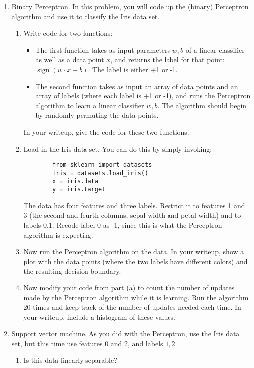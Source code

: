 \documentclass{article}
\begin{document}
\begin{enumerate}
    \item Binary Perceptron. In this problem, you will code up the (binary) Perceptron algorithm and use it to classify the Iris data set.
    \begin{enumerate}
        \item Write code for two functions:
        \begin{itemize}
            \item The first function takes as input parameters $w, b$ of a linear classifier as well as a data point $x$, and returns the label for that point: $\operatorname{sign}(w \cdot x+b)$. The label is either +1 or -1.
            \item The second function takes as input an array of data points and an array of labels (where each label is +1 or -1), and runs the Perceptron algorithm to learn a linear classifier $w, b$. The algorithm should begin by randomly permuting the data points.
        \end{itemize}
        In your writeup, give the code for these two functions.

        \item Load in the Iris data set. You can do this by simply invoking:
        \begin{verbatim}
        from sklearn import datasets
        iris = datasets.load_iris()
        x = iris.data
        y = iris.target
        \end{verbatim}
        The data has four features and three labels. Restrict it to features 1 and 3 (the second and fourth columns, sepal width and petal width) and to labels 0,1. Recode label 0 as -1, since this is what the Perceptron algorithm is expecting.

        \item Now run the Perceptron algorithm on the data. In your writeup, show a plot with the data points (where the two labels have different colors) and the resulting decision boundary.

        \item Now modify your code from part (a) to count the number of updates made by the Perceptron algorithm while it is learning. Run the algorithm 20 times and keep track of the number of updates needed each time. In your writeup, include a histogram of these values.
    \end{enumerate}

    \item Support vector machine. As you did with the Perceptron, use the Iris data set, but this time use features 0 and 2, and labels $1,2$.
    \begin{enumerate}
        \item Is this data linearly separable?


\end{enumerate}
\end{enumerate}
\end{document}

